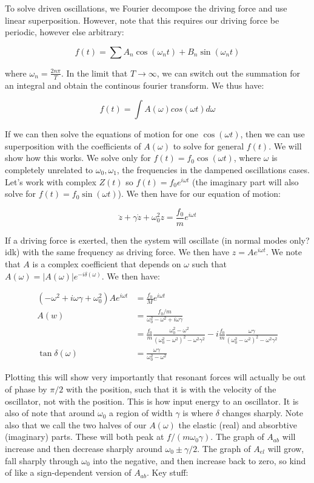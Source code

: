 \documentclass{report}
\begin{document}
To solve driven oscillations, we Fourier decompose the driving force and use linear superposition. However, note that this requires our driving force be periodic, however else arbitrary:

$$f(t) = \sum{A_n\cos(\omega_nt) + B_n\sin(\omega_nt)}$$

where $\omega_n = \frac{2n\pi}{T}$. In the limit that $T \to \infty$, we can switch out the summation for an integral and obtain the continous fourier transform. We thus have:

$$f(t) = \int{A(\omega)cos(\omega t)d\omega}$$

If we can then solve the equations of motion for one $\cos(\omega t)$, then we can use superposition with the coefficients of $A(\omega)$ to solve for general $f(t)$. We will show how this works. We solve only for $f(t) = f_0\cos(\omega t)$, where $\omega$ is completely unrelated to $\omega_0,\omega_1$, the frequencies in the dampened oscillations cases. Let's work with complex $Z(t)$ so $f(t) = f_0e^{i\omega t}$ (the imaginary part will also solve for $f(t) = f_0\sin(\omega t)$). We then have for our equation of motion:

$$\ddot{z} + \gamma\dot{z} + \omega_0^2z = \frac{f_0}{m}e^{i\omega t}$$

If a driving force is exerted, then the system will oscillate (in normal modes only? idk) with the same frequency as driving force. We then have $z = Ae^{i\omega t}$. We note that $A$ is a complex coefficient that depends on $\omega$ such that $A(\omega) = |A(\omega)|e^{-i\delta(\omega)}$. We then have:

\begin{align*}
(-\omega^2 + i\omega\gamma + \omega_0^2)Ae^{i\omega t} &= \frac{f_0}{M}e^{i\omega t}\\
A(w) &= \frac{f_0/m}{\omega_0^2 - \omega^2 + i\omega\gamma}\\
&= \frac{f_0}{m}\frac{\omega_0^2 - \omega^2}{(\omega_0^2 - \omega^2)^2 - \omega^2\gamma^2} - i \frac{f_0}{m}\frac{\omega\gamma}{{(\omega_0^2 - \omega^2)^2 - \omega^2\gamma^2}}\\
\tan{\delta(\omega)} &= \frac{\omega\gamma}{\omega_0^2 - \omega^2}
\end{align*}

Plotting this will show very importantly that resonant forces will actually be out of phase by $\pi/2$ with the position, such that it is with the velocity of the oscillator, not with the position. This is how input energy to an oscillator.  It is also of note that around $\omega_0$ a region of width $\gamma$ is where $\delta$ changes sharply. Note also that we call the two halves of our $A(\omega)$ the elastic (real) and absorbtive (imaginary) parts. These will both peak at $f/(m\omega_0\gamma)$. The graph of $A_{ab}$ will increase and then decrease sharply around $\omega_0 \pm \gamma/2$. The graph of $A_{el}$ will grow, fall sharply through $\omega_0$ into the negative, and then increase back to zero, so kind of like a sign-dependent version of $A_{ab}$. Key stuff:
\end{document}
